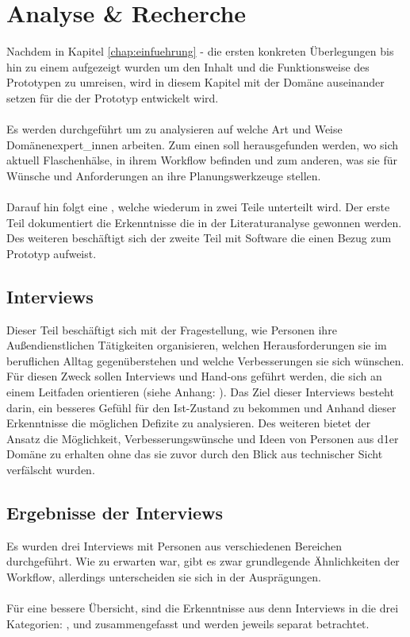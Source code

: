 \documentclass[../Bachelorarbeit.tex]{subfiles}
\begin{document}
\chapter{Analyse \& Recherche}
\label{chap:analyse}

Nachdem in Kapitel \ref{chap:einfuehrung} -  die ersten konkreten Überlegungen bis hin zu einem  aufgezeigt wurden um den Inhalt und die Funktionsweise des Prototypen zu umreisen, wird in diesem Kapitel mit der Domäne auseinander setzen für die der Prototyp entwickelt wird.\\
\\
Es werden  durchgeführt um zu analysieren auf welche Art und Weise  Domänenexpert\_innen arbeiten.
Zum einen soll herausgefunden werden, wo sich aktuell Flaschenhälse, in ihrem Workflow befinden und zum anderen, was sie für Wünsche und Anforderungen an ihre Planungswerkzeuge stellen.\\
\\
Darauf hin folgt eine , welche wiederum in zwei Teile unterteilt wird.
Der erste Teil dokumentiert die Erkenntnisse die in der Literaturanalyse gewonnen werden.
Des weiteren beschäftigt sich der zweite Teil mit Software die einen Bezug zum Prototyp aufweist.

\section{Interviews}
\label{chap:analyse:sec:interviews}
Dieser Teil beschäftigt sich mit der Fragestellung, wie Personen ihre Außendienstlichen Tätigkeiten organisieren, welchen Herausforderungen sie im beruflichen Alltag gegenüberstehen und welche Verbesserungen sie sich wünschen. 
Für diesen Zweck sollen Interviews und Hand-ons  geführt werden, die sich an einem Leitfaden orientieren (siehe Anhang: ). 
Das Ziel dieser Interviews besteht darin, ein besseres Gefühl für den Ist-Zustand zu bekommen und Anhand dieser Erkenntnisse die möglichen Defizite zu analysieren.
Des weiteren bietet der Ansatz die Möglichkeit, Verbesserungswünsche und Ideen von Personen aus d1er Domäne zu erhalten ohne das sie zuvor durch den Blick aus technischer Sicht verfälscht wurden.

\section{Ergebnisse der Interviews}
Es wurden drei Interviews mit Personen aus verschiedenen Bereichen durchgeführt. 
Wie zu erwarten war, gibt es zwar grundlegende Ähnlichkeiten der Workflow, allerdings unterscheiden sie sich in der Ausprägungen.\\
\\
Für eine bessere Übersicht, sind die Erkenntnisse aus denn Interviews in die drei Kategorien: ,  und  zusammengefasst und werden jeweils separat betrachtet.
\end{document}
